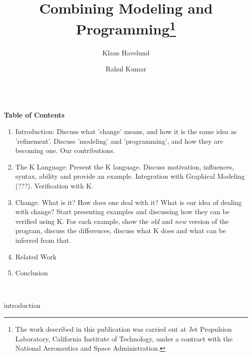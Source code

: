 \documentclass{llncs}
\title{Combining Modeling and Programming\thanks{The work
  described in this publication was carried out at Jet Propulsion
  Laboratory, California Institute of Technology, under a contract with
  the National Aeronautics and Space Administration.}}
\author{Klaus Havelund \and Rahul Kumar}
\institute{
  Jet Propulsion Laboratory\\
  California Institute of Technology\\
  California, USA
}
\begin{document}
\maketitle




\vspace{1cm}
\color{red}
\noindent\makebox[\linewidth]{\rule{\paperwidth}{0.4pt}}\\

{\bf Table of Contents}

\begin{enumerate}
  \item Introduction: Discuss what 'change' means, and how it is the
    same idea as 'refinement'. Discuss 'modeling' and 'programming',
    and how they are becoming one. Our contributions. 
  \item The K Language: Present the K language. Discuss motivation,
    influences, syntax, ability and provide an example. Integration
    with Graphical Modeling (???). Verification with K.
  \item Change. What is it? How does one deal with it? What is our
    idea of dealing with change? Start presenting examples and
    discussing how they can be verified using K. For each example,
    show the \emph{old} and \emph{new} version of the program, discuss
    the differences, discuss what K does and what can be inferred from
    that.
  \item Related Work
  \item Conclusion
\end{enumerate}

\noindent\makebox[\linewidth]{\rule{\paperwidth}{0.4pt}}\\
\color{black}
\vspace{1cm}


 	{introduction}









\end{document}

